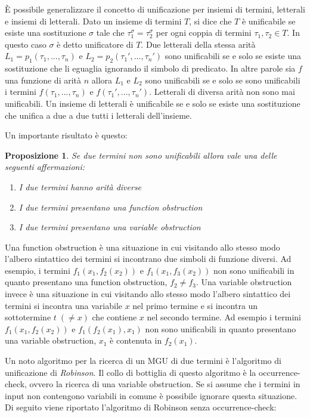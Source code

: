 \documentclass[./main.tex]{subfiles}
\begin{document}
È possibile generalizzare il concetto di unificazione per insiemi di termini, letterali e insiemi di letterali.
Dato un insieme di termini $T$, si dice che $T$ è unificabile se esiste una sostituzione $\sigma$ tale che $\tau_1^\sigma = \tau_2^\sigma$
per ogni coppia di termini $\tau_1, \tau_2 \in T$. In questo caso $\sigma$ è detto unificatore di $T$. 
Due letterali della stessa arità $L_1 = p_1(\tau_1, ..., \tau_n)$ e $L_2 = p_2(\tau_1', ..., \tau_n')$ 
sono unificabili se e solo se esiste una sostituzione che li eguaglia ignorando il simbolo di predicato.
In altre parole sia $f$ una funzione di arità $n$ allora $L_1$ e $L_2$ sono unificabili se e solo se sono unificabili i termini
$f(\tau_1, ..., \tau_n)$ e $f(\tau_1', ..., \tau_n')$.
Letterali di diversa arità non sono mai unificabili.
Un insieme di letterali è unificabile se e solo se esiste una sostituzione che unifica a due a due tutti i letterali dell'insieme.


Un importante risultato è questo:
\newtheorem{proposition}{Proposizione}
\begin{proposition}
  Se due termini non sono unificabili allora vale una delle seguenti affermazioni:
  \begin{enumerate}
    \item I due termini hanno arità diverse
    \item I due termini presentano una function obstruction 
    \item I due termini presentano una variable obstruction
  \end{enumerate}
\end{proposition}

Una function obstruction è una situazione in cui visitando allo stesso modo l'albero sintattico dei termini si incontrano
due simboli di funzione diversi. Ad esempio, i termini $f_1(x_1, f_2(x_2))$ e $f_1(x_1, f_3(x_2))$ non sono unificabili in quanto
presentano una function obstruction, $f_2 \neq f_3$. Una variable obstruction invece è una situazione in cui visitando allo stesso modo
l'albero sintattico dei termini si incontra una variabile $x$ nel primo termine 
e si incontra un sottotermine $t \; (\neq x)$ che contiene $x$ nel secondo termine. Ad esempio i termini $f_1(x_1, f_2(x_2))$ e $f_1(f_2(x_1), x_1)$
non sono unificabili in quanto presentano una variable obstruction, $x_1$ è contenuta in $f_2(x_1)$.


Un noto algoritmo per la ricerca di un MGU di due termini è l'algoritmo di unificazione di \textit{Robinson}. Il collo di bottiglia di questo 
algoritmo è la occurrence-check, ovvero la ricerca di una variable obstruction. Se si assume che i termini in 
input non contengono variabili in comune è possibile ignorare questa situazione. Di seguito viene riportato l'algoritmo di Robinson
senza occurrence-check:
\end{document}
